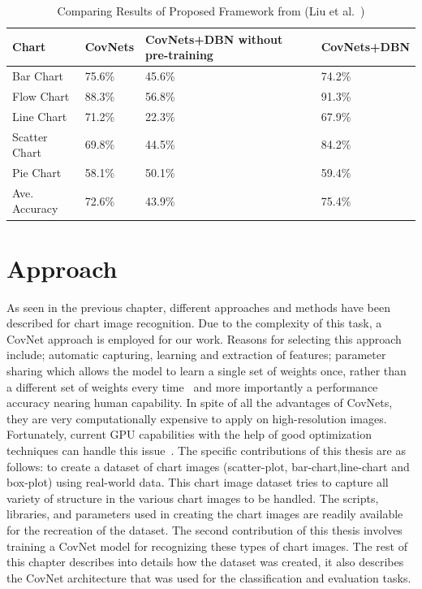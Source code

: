 \documentclass[12pt, a4paper,oneside]{report}
\begin{document}
\begin{table}[h]
	\centering {} \small
	\begin{tabular}{|p{3cm}|p{3cm}|p{3cm}|p{3cm}|}
		
		\hline
		Chart & CovNets&CovNets+DBN without pre-training & CovNets+DBN \\ \hline
				
		Bar Chart & 75.6\% & 45.6\% & 74.2\% \\ \hline
		Flow Chart & 88.3\%  & 56.8\% & 91.3\%  \\ \hline
		Line Chart  & 71.2\%  & 22.3\% & 67.9\% \\ \hline
	
		Scatter Chart & 69.8\% & 44.5\% & 84.2\% \\ \hline
		Pie Chart & 58.1\%  & 50.1\% & 59.4\%    \\ \hline
		Ave. Accuracy & 72.6\%  & 43.9\% & 75.4\% \\ \hline
		
	\end{tabular}
	\caption {Comparing Results of Proposed Framework from (Liu et al.~\cite{liu2015chart}) }	
	\label{table:deep}
	
\end{table}


\chapter{Approach}
As seen in the previous chapter, different approaches and methods have been described for chart image recognition. Due to the complexity of this task, a CovNet approach is employed for our work. Reasons for selecting this approach include; automatic capturing, learning and extraction of features; parameter sharing which allows the model to learn a single set of weights once, rather than a different set of weights every time~\cite{Rodriguez} and more importantly a performance accuracy nearing human capability. In spite of all the advantages of CovNets, they are very computationally expensive to apply on high-resolution images. Fortunately, current GPU capabilities with the help of good optimization techniques can handle this issue~\cite{krizhevsky2012imagenet}. \newline\newline
The specific contributions of this thesis are as follows: to create a dataset of chart images (scatter-plot, bar-chart,line-chart and box-plot) using real-world data. This chart image dataset tries to capture all variety of structure in the various chart images to be handled. The scripts, libraries, and parameters used in creating the chart images are readily available for the recreation of the dataset. The second contribution of this thesis involves training a CovNet model for recognizing these types of chart images.\newline
The rest of this chapter describes into details how the dataset was created, it also describes the CovNet architecture that was used for the classification and evaluation tasks.
\end{document}
